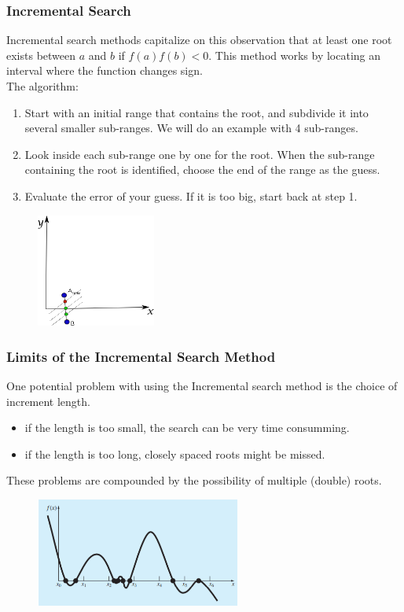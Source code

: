 \documentclass{if-beamer}
\begin{document}
\begin{frame}
\frametitle{Incremental Search}
Incremental search methods capitalize on this observation that at least one root exists between $a$ and $b$ if $f(a)f(b)<0$. This method works by locating an interval where the function changes sign.  \\
\vspace{0.25cm}
The algorithm:
\begin{enumerate}
	\item Start with an initial range that contains the root, and subdivide it into several smaller sub-ranges. We will do an example with 4 sub-ranges.
	\item Look inside each sub-range one by one for the root. When the sub-range containing the root is identified, choose the end of the range as the guess.
	\item Evaluate the error of your guess. If it is too big, start back at step 1. 
\end{enumerate}
\begin{figure}
	\centering
	\includegraphics[width = 0.35\textwidth]{figures/incremental4}
\end{figure}
\end{frame}

\begin{frame}
\frametitle{Limits of the Incremental Search Method}
One potential problem with using the Incremental search method is the choice of increment length.
\begin{itemize}
	\item if the length is too small, the search can be very time consumming.
	\item if the length is too long, closely spaced roots might be missed. 
\end{itemize}
These problems are compounded by the possibility of multiple (double) roots.
\begin{figure}
	\centering
	\includegraphics[width = 0.6\textwidth]{figures/fail}
\end{figure}

\end{frame}
\end{document}
